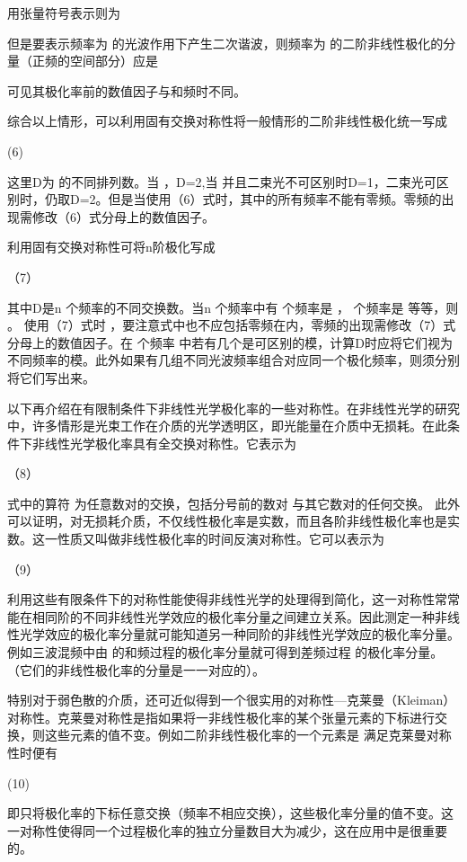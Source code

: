 用张量符号表示则为


但是要表示频率为 的光波作用下产生二次谐波，则频率为 的二阶非线性极化的分量（正频的空间部分）应是

可见其极化率前的数值因子与和频时不同。

综合以上情形，可以利用固有交换对称性将一般情形的二阶非线性极化统一写成

                        (6)

这里D为 的不同排列数。当 ，D=2,当 并且二束光不可区别时D=1，二束光可区别时，仍取D=2。但是当使用（6）式时，其中的所有频率不能有零频。零频的出现需修改（6）式分母上的数值因子。

利用固有交换对称性可将n阶极化写成

                     （7）

其中D是n 个频率的不同交换数。当n 个频率中有 个频率是 ， 个频率是 等等，则 。 使用（7）式时 ，要注意式中也不应包括零频在内，零频的出现需修改（7）式分母上的数值因子。在 个频率 中若有几个是可区别的模，计算D时应将它们视为不同频率的模。此外如果有几组不同光波频率组合对应同一个极化频率，则须分别将它们写出来。

以下再介绍在有限制条件下非线性光学极化率的一些对称性。在非线性光学的研究中，许多情形是光束工作在介质的光学透明区，即光能量在介质中无损耗。在此条件下非线性光学极化率具有全交换对称性。它表示为

                    （8）

式中的算符 为任意数对的交换，包括分号前的数对 与其它数对的任何交换。
此外可以证明，对无损耗介质，不仅线性极化率是实数，而且各阶非线性极化率也是实数。这一性质又叫做非线性极化率的时间反演对称性。它可以表示为

                        （9）

利用这些有限条件下的对称性能使得非线性光学的处理得到简化，这一对称性常常能在相同阶的不同非线性光学效应的极化率分量之间建立关系。因此测定一种非线性光学效应的极化率分量就可能知道另一种同阶的非线性光学效应的极化率分量。例如三波混频中由 的和频过程的极化率分量就可得到差频过程 的极化率分量。（它们的非线性极化率的分量是一一对应的）。

特别对于弱色散的介质，还可近似得到一个很实用的对称性—克莱曼（Kleiman）对称性。克莱曼对称性是指如果将一非线性极化率的某个张量元素的下标进行交换，则这些元素的值不变。例如二阶非线性极化率的一个元素是 满足克莱曼对称性时便有

                      (10)

即只将极化率的下标任意交换（频率不相应交换），这些极化率分量的值不变。这一对称性使得同一个过程极化率的独立分量数目大为减少，这在应用中是很重要的。

